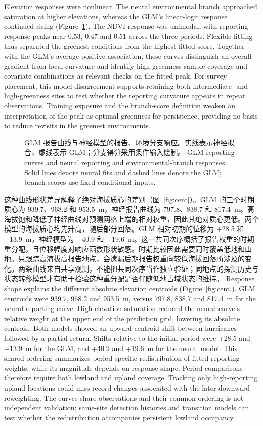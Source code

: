 \else
Elevation responses were nonlinear. The neural environmental branch approached saturation at higher elevations, whereas the GLM's linear-logit response continued rising (Figure~\ref{fig:pd}). The NDVI response was unimodal, with reporting-response peaks near 0.53, 0.47 and 0.51 across the three periods. Flexible fitting thus separated the greenest conditions from the highest fitted score. Together with the GLM's average positive association, these curves distinguish an overall gradient from local curvature and identify high-greenness sample coverage and covariate combinations as relevant checks on the fitted peak. For survey placement, this model disagreement supports retaining both intermediate- and high-greenness sites to test whether the reporting curvature appears in repeat observations. Training exposure and the branch-score definition weaken an interpretation of the peak as optimal greenness for persistence, providing no basis to reduce revisits in the greenest environments.
\fi
\begin{figure}[htbp]\centering{}
\caption{\ifzh
GLM 报告曲线与神经模型的报告、环境分支响应。实线表示神经拟合，虚线表示 GLM；分支得分采用条件输入绘制。
\else
GLM reporting curves and neural reporting and environmental-branch responses. Solid lines denote neural fits and dashed lines denote the GLM; branch scores use fixed conditional inputs.
\fi}\label{fig:pd}
\end{figure}
\ifzh
这种曲线形状差异解释了绝对海拔质心的差别（图~\ref{fig:cent}）。GLM 的三个时期质心为 939.7、968.2 和 953.5~m，神经报告曲线为 797.8、838.7 和 817.4~m。高海拔饱和降低了神经曲线对预测网格上端的相对权重，因此其绝对质心更低。两个模型的海拔质心均先升高，随后部分回落。GLM 相对初期的位移为 +28.5 和 +13.9~m，神经模型为 +40.9 和 +19.6~m。这一共同次序概括了报告权重的时期重分配，且位移幅度对响应函数形状敏感。时期比较因此需要同时覆盖低地和山地。只跟踪高海拔高报告地点，会遗漏后期报告权重向较低海拔回落所涉及的变化。两条曲线来自共享观测，不能把共同次序当作独立验证；同地点的探测历史与状态转移模型才有助于检验这种重分配是否伴随低地占域状态的维持。
\else
Response shape explains the different absolute elevation centroids (Figure~\ref{fig:cent}). GLM centroids were 939.7, 968.2 and 953.5~m, versus 797.8, 838.7 and 817.4~m for the neural reporting curve. High-elevation saturation reduced the neural curve's relative weight at the upper end of the prediction grid, lowering its absolute centroid. Both models showed an upward centroid shift between hurricanes followed by a partial return. Shifts relative to the initial period were +28.5 and +13.9~m for the GLM, and +40.9 and +19.6~m for the neural model. This shared ordering summarizes period-specific redistribution of fitted reporting weights, while its magnitude depends on response shape. Period comparisons therefore require both lowland and upland coverage. Tracking only high-reporting upland locations could miss record changes associated with the later downward reweighting. The curves share observations and their common ordering is not independent validation; same-site detection histories and transition models can test whether the redistribution accompanies persistent lowland occupancy.
